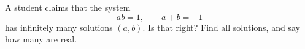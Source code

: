 A student claims that the system
\[
ab=1,\qquad a+b=-1
\]
has infinitely many solutions $(a,b)$. Is that right? Find all solutions, and say how many are real.
